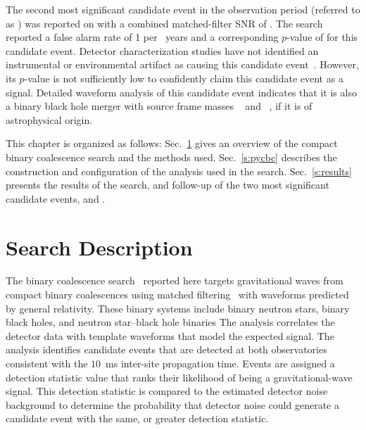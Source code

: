 The second most significant candidate event in the observation period
(referred to as \SECONDMONDAY{}) was reported on \SecondTime{} with a combined
matched-filter SNR of \PyCBCSecondEventRhoC.  The search reported a false
alarm rate of 1 per \CBCSECONDEVENTIFAR~years and a corresponding $p$-value 
 of \CBCSECONDEVENTFAP{} for this candidate event.  Detector
characterization studies have not identified an instrumental or environmental
artifact as causing this candidate event~\cite{GW150914-DETCHAR}. However, its
$p$-value is not sufficiently low to confidently claim this
candidate event as a signal.  Detailed waveform analysis of this candidate
event indicates that it is also a binary black hole merger with source frame
masses {\MONESCOMPACTSecondMonday~\Msun} and
{\MTWOSCOMPACTSecondMonday~\Msun}, if it is of astrophysical origin.
 
This chapter is organized as follows: Sec.~\ref{s:overview} gives an overview of
the compact binary coalescence search and the methods used.
Sec.~\ref{s:pycbc} describes the construction and
configuration of the analysis used in the search.
Sec.~\ref{s:results} presents the results of the search, and follow-up of the
two most significant candidate events, \TheEvent{} and \SECONDMONDAY{}.


\section{Search Description}
\label{s:overview}

The binary coalescence
search~\cite{thorne.k:1987,Sathyaprakash:1991mt,Cutler:1992tc,Finn:1992wt,Finn:1992xs,Dhurandhar:1992mw,Balasubramanian:1995bm,Flanagan:1997sx}
reported here targets gravitational waves from compact binary coalescences using
matched filtering~\cite{wainstein:1962} with waveforms predicted by general
relativity. These binary systems include
binary neutron stars, binary
black holes, and neutron star--black hole binaries
 The \pycbc{} analysis correlates the detector
data with template waveforms that model the expected signal. The analysis
identifies candidate events that are detected at both observatories consistent
with the $10$~ms inter-site propagation time. Events are assigned a
detection statistic value that ranks their likelihood of being a
gravitational-wave signal. This detection statistic is compared to the
estimated detector noise background to determine the probability that detector
noise could generate a candidate event with the same, or greater detection
statistic.

